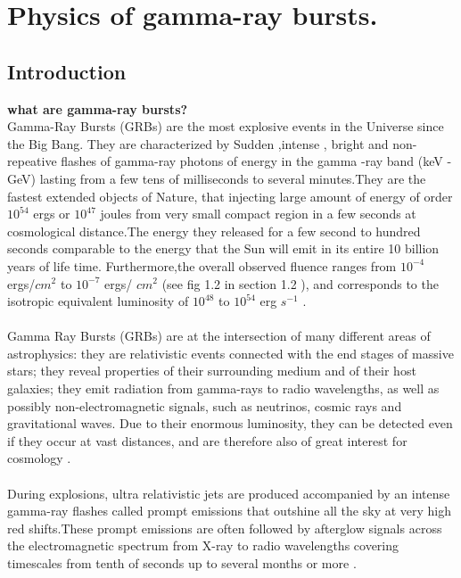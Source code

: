 \setcounter{chapter}{0}
\chapter{Physics of gamma-ray bursts.}
\section{Introduction}
\textbf{what are gamma-ray bursts?}\\
Gamma-Ray Bursts (GRBs) are the most explosive events in the Universe since the Big Bang. They are characterized  by Sudden ,intense , bright and non-repeative flashes of gamma-ray photons of energy in the gamma -ray band (keV - GeV) lasting from a few tens of milliseconds  to several minutes.They are the fastest extended objects of Nature, that injecting large amount of energy of order $10^{54}$ ergs or $ 10^{47} $ joules from very small compact region in a few seconds at cosmological distance.The energy they released for a few second to hundred seconds comparable to the energy that  the Sun will emit in its entire 10 billion years of life time. Furthermore,the overall observed fluence ranges from $10^{-4} $ ergs/$ cm^{2}$ to $ 10^{-7} $ ergs/ $ cm^{2} $ (see fig 1.2 in  section 1.2 ), and  corresponds to the isotropic equivalent luminosity of $ 10^{48} $  to  $10^{54} $ erg $ s^{-1} $ \citep{1}.\\\\
Gamma Ray Bursts (GRBs) are at the intersection of many different areas of astrophysics: they are relativistic events connected with the end stages of massive stars; they reveal properties of their surrounding medium and of their host galaxies; they emit radiation from gamma-rays to radio wavelengths, as well as possibly non-electromagnetic signals, such as neutrinos, cosmic rays and gravitational waves. Due to their enormous luminosity, they can be detected even if they occur at vast distances, and are therefore also of great interest for cosmology \citep{2}.\\\\
 During  explosions, ultra relativistic jets are produced accompanied by an intense gamma-ray flashes called prompt emissions that outshine all the sky at very high red shifts.These prompt emissions are often followed by afterglow signals across the electromagnetic spectrum from X-ray to radio wavelengths covering timescales from tenth of seconds up to several months or more \citep{1,2}.\\\\
